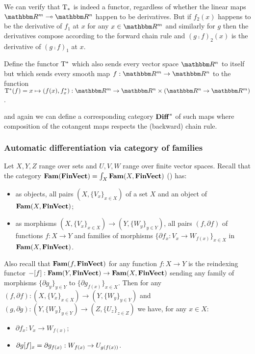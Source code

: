 We can verify that $\mathrm{T}_*$ is indeed a functor, regardless of whether the linear maps $\RR^m \linearto
\RR^n$ happen to be derivatives. But if $f_2(x)$ happens to be the derivative of $f_1$ at $x$ for any $x \in
\RR^m$ and similarly for $g$ then the derivatives compose according to the forward chain rule and $(g \comp
f)_2(x)$ is the derivative of $(g \comp f)_1$ at $x$.

\begin{definition}
Define the functor $\mathrm{T}^*$ which also sends every vector space $\RR^n$ to itself but which sends every
smooth map $f: \RR^m \to \RR^n$ to the function $\tangents^*(f) = x \mapsto (f(x), \pullf{f}_x): \RR^m \to
\RR^n \times (\RR^n \to \RR^m)$.
\end{definition}

\noindent and again we can define a corresponding category $\mathbf{Diff}^*$ of such maps where composition of the
cotangent maps respects the (backward) chain rule.

\subsubsection{Automatic differentiation via category of families}

Let $X, Y, Z$ range over sets and $U, V, W$ range over finite vector spaces. Recall that the category
$\mathbf{Fam}(\mathbf{FinVect}) = \int_{X}\mathbf{Fam}(X, \mathbf{FinVect})$ () has:
\begin{itemize}
\item as objects, all pairs $(X, \{V_x\}_{x \in X})$ of a set $X$ and an object of $\mathbf{Fam}(X,\mathbf{FinVect})$;
\item as morphisms $(X, \{V_x\}_{x \in X}) \to (Y, \{W_y\}_{y \in Y})$, all pairs $(f, \partial f)$ of
functions $f: X \to Y$ and families of morphisms $\{\partial f_x: V_x \to W_{f(x)}\}_{x \in X}$
in $\mathbf{Fam}(X,\mathbf{FinVect})$.
\end{itemize}

Also recall that $\mathbf{Fam}(f, \mathbf{FinVect})$ for any function $f: X \to Y$ is the reindexing functor $-[f]:
\mathbf{Fam}(Y, \mathbf{FinVect}) \to \mathbf{Fam}(X, \mathbf{FinVect})$ sending any family of morphisms $\{\partial g_y\}_{y \in Y}$ to
$\{\partial g_{f(x)}\}_{x \in X}$. Then for any $(f, \partial f): (X, \{V_x\}_{x \in X}) \to (Y, \{W_y\}_{y
\in Y})$ and $(g, \partial g): (Y, \{W_y\}_{y \in Y}) \to (Z, \{U_z\}_{z \in Z})$ we have, for any $x \in X$:
\begin{itemize}
\item $\partial f_x: V_x \to W_{f(x)}$;
\item $\partial g[f]_x = \partial g_{f(x)}: W_{f(x)} \to U_{g(f(x))}$.
\end{itemize}

